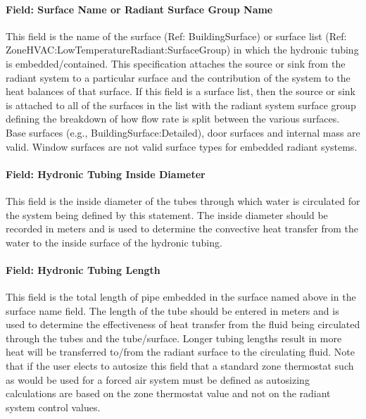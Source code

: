 \paragraph{Field: Surface Name or Radiant Surface Group Name}\label{field-surface-name-or-radiant-surface-group-name}

This field is the name of the surface (Ref: BuildingSurface) or surface list (Ref: ZoneHVAC:LowTemperatureRadiant:SurfaceGroup) in which the hydronic tubing is embedded/contained. This specification attaches the source or sink from the radiant system to a particular surface and the contribution of the system to the heat balances of that surface. If this field is a surface list, then the source or sink is attached to all of the surfaces in the list with the radiant system surface group defining the breakdown of how flow rate is split between the various surfaces. Base surfaces (e.g., BuildingSurface:Detailed), door surfaces and internal mass are valid. Window surfaces are not valid surface types for embedded radiant systems.

\paragraph{Field: Hydronic Tubing Inside Diameter}\label{field-hydronic-tubing-inside-diameter-000}

This field is the inside diameter of the tubes through which water is circulated for the system being defined by this statement. The inside diameter should be recorded in meters and is used to determine the convective heat transfer from the water to the inside surface of the hydronic tubing.

\paragraph{Field: Hydronic Tubing Length}\label{field-hydronic-tubing-length}

This field is the total length of pipe embedded in the surface named above in the surface name field. The length of the tube should be entered in meters and is used to determine the effectiveness of heat transfer from the fluid being circulated through the tubes and the tube/surface. Longer tubing lengths result in more heat will be transferred to/from the radiant surface to the circulating fluid. Note that if the user elects to autosize this field that a standard zone thermostat such as would be used for a forced air system must be defined as autosizing calculations are based on the zone thermostat value and not on the radiant system control values.

